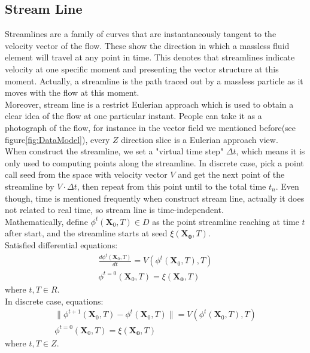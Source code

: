 \documentclass[
     11pt,         %
     a4paper,      %
     oneside,
     ]{article}
\newcommand{\vect}[1]{\boldsymbol{#1}}
\begin{document}
	\subsection{Stream  Line}
	Streamlines are a family of curves that are instantaneously tangent to the velocity vector of the flow. These show the direction in which a massless fluid element will travel at any point in time\cite{StreamlineDefine}. This denotes that streamlines indicate velocity at one specific moment and presenting the vector structure at this moment. Actually, a streamline is the path traced out by a massless particle as it moves with the flow at this moment.\\
	Moreover, stream line is a restrict Eulerian approach which is used to obtain a clear idea of the flow at one particular instant. People can take it as a photograph of the flow, for instance in the vector field we mentioned before(see figure\ref{fig:DataModel}), every $Z$ direction slice is a Eulerian approach view.\\
	When construct the streamline, we set a "virtual time step" $\Delta t$, which means it is only used to computing points along the streamline. In discrete case, pick a point call seed from the space with velocity vector $V$ and get the next point of the streamline by $V\cdot\Delta t$, then repeat from this point until to the total time $t_{n}$. Even though, time is mentioned frequently when construct stream line, actually it does not related to real time, so stream line is time-independent.\\
	Mathematically, define $\phi^{t}(\vect{X}_{0},T)\in D$ as the point streamline reaching at time $t$ after start, and the streamline starts at seed $\xi(\vect{X_{0}},T)$. \\
	Satisfied differential equations:\\
	\begin{eqnarray}
	\frac{d\phi^{t}(\vect{X}_{0},T)}{dt}=V(\phi^{t}(\vect{X}_{0},T),T)\\
	\phi^{t=0}(\vect{X}_{0},T)=\xi(\vect{X_{0}},T)
	\end{eqnarray}
	where $t,T\in R$.\\
	In discrete case, equations:\\
	\begin{eqnarray}
	\lVert\phi^{t+1}(\vect{X}_{0},T)-\phi^{t}(\vect{X}_{0},T)\rVert=V(\phi^{t}(\vect{X}_{0},T),T)\\
	\phi^{t=0}(\vect{X}_{0},T)=\xi(\vect{X_{0}},T)
	\end{eqnarray}
	where $t,T\in Z$.\\ 
\end{document}

